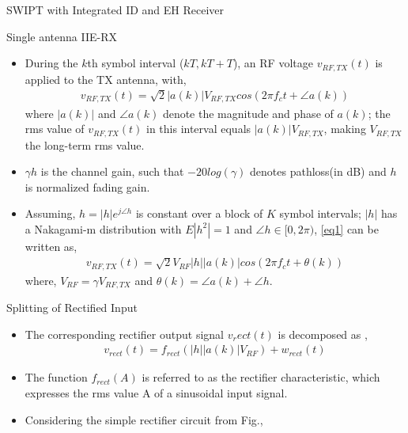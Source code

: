 \documentclass{beamer}
\begin{document}
\begin{section}{SWIPT with Integrated ID and EH Receiver}
\begin{subsection}{Single antenna IIE-RX}
\begin{frame}
\begin{itemize}
        \item During the $k$th symbol interval ($kT,kT+T$), an RF voltage $v_{RF,TX}(t)$ is applied to the TX antenna, with,
        \begin{align}
            v_{RF,TX}(t)=\sqrt{2}|a(k)|V_{RF,TX}cos(2\pi f_{c}t+\angle a(k))
            \label{eq1}
        \end{align}
      where $|a(k)|$ and $\angle a(k)$ denote the magnitude and phase of $a(k)$; the rms value of $v_{RF,TX}(t)$ in this interval equals $|a(k)|V_{RF,TX}$, making $V_{RF,TX}$ the long-term rms value. 
      \item $\gamma h$ is the channel gain, such that $-20log(\gamma)$ denotes pathloss(in dB) and $h$ is normalized fading gain.
      \item Assuming, $h=|h|e^{j\angle h}$ is constant over a block of $K$ symbol intervals; $|h|$ has a Nakagami-m distribution with $E|h^{2}|=1$ and $\angle h\in[0,2\pi)$, \eqref{eq1} can be written as,
      \begin{align}
          v_{RF,TX}(t)=\sqrt{2}V_{RF}|h||a(k)|cos(2\pi f_{c}t+\theta(k))
          \end{align}
          where, $V_{RF}=\gamma V_{RF,TX}$ and $\theta(k)=\angle a(k)+\angle h$.
      \end{itemize}
\end{frame}
\end{subsection}
\begin{subsection}{Splitting of Rectified Input}

\begin{frame}{}
    \begin{itemize}
        \item The corresponding rectifier output signal $v_rect(t)$ is decomposed as ,
        \begin{align}
            v_{rect}(t)=f_{rect}(|h||a(k)|V_{RF})+w_{rect}(t)
        \end{align}
        \item The function $f_{rect}(A)$ is referred to as the rectifier characteristic, which expresses the rms value A of a sinusoidal input signal.
        \item Considering  the simple rectifier circuit from Fig.,


\end{itemize}
\end{frame}
\end{subsection}
\end{section}
\end{document}

